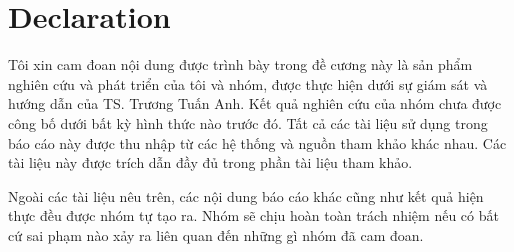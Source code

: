 \chapter{Declaration}

Tôi xin cam đoan nội dung được trình bày trong đề cương này là sản phẩm nghiên cứu và phát triển của tôi và nhóm, được thực hiện dưới sự giám sát và hướng dẫn của TS. Trương Tuấn Anh. Kết quả nghiên cứu của nhóm chưa được công bố dưới bất kỳ hình thức nào trước đó. Tất cả các tài liệu sử dụng trong báo cáo này được thu nhập từ các hệ thống và nguồn tham khảo khác nhau. Các tài liệu này được trích dẫn đầy đủ trong phần tài liệu tham khảo. \par
Ngoài các tài liệu nêu trên, các nội dung báo cáo khác cũng như kết quả hiện thực đều được nhóm tự tạo ra. Nhóm sẽ chịu hoàn toàn trách nhiệm nếu có bất cứ sai phạm nào xảy ra liên quan đến những gì nhóm đã cam đoan. \par
\vspace{1cm}

\small

\hspace*{\fill}{TPHCM, Tháng 9/2023}

\hspace*{\fill}{Nguyễn Văn Khoa}

\hspace*{\fill}{Hồ Đức Hưng}

